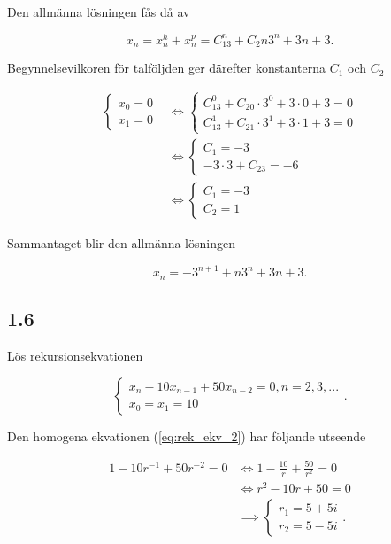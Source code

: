 \documentclass[a4paper]{article}
\begin{document}
Den allmänna lösningen fås då av

\begin{equation*}
	x_n = x_n^h + x_n^p = C_13^n + C_2n3^n + 3n + 3.
\end{equation*}

Begynnelsevilkoren för talföljden ger därefter konstanterna $C_1$ och $C_2$

\begin{align*}
	\begin{cases}
		x_0 = 0\\
		x_1 = 0
	\end{cases}
	&\iff
	\begin{cases}
		C_13^0 + C_20\cdot3^0 + 3\cdot 0 + 3 = 0\\
		C_13^1 + C_21\cdot3^1 + 3\cdot 1 + 3 = 0
	\end{cases}\\
	&\iff
	\begin{cases}
		C_1 = -3\\
		-3\cdot 3 + C_23 = -6
	\end{cases}\\
	&\iff
	\begin{cases}
		C_1 = -3\\
		C_2 = 1
	\end{cases}
\end{align*}

Sammantaget blir den allmänna lösningen

\begin{equation*}
	x_n = -3^{n+1} + n3^n + 3n + 3.
\end{equation*}

\subsection*{1.6}

Lös rekursionsekvationen

\begin{equation}
	\begin{cases}
		x_{n} - 10x_{n-1} + 50x_{n-2} = 0, n = 2,3,...\\
		x_0 = x_1 = 10
	\end{cases}\label{eq:rek_ekv_2}.
\end{equation}

Den homogena ekvationen (\ref{eq:rek_ekv_2}) har följande utseende

\begin{align*}
	1 - 10r^{-1} + 50r^{-2} = 0 &\iff 1 - \frac{10}{r} + \frac{50}{r^2} = 0\\
								&\iff r^2 - 10r + 50 = 0\\
								&\implies	\begin{cases}
												r_1 = 5 + 5i\\
												r_2 = 5 - 5i
											\end{cases}.
\end{align*}
\end{document}
